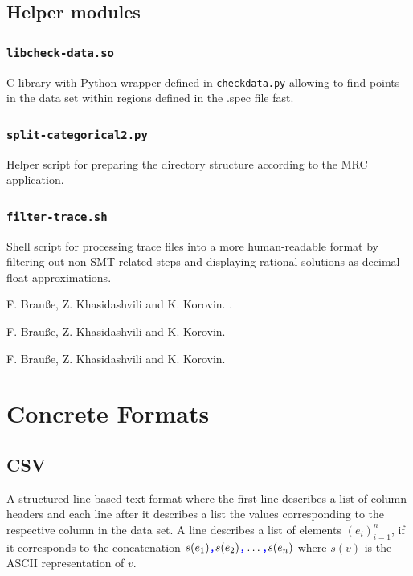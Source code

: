 \documentclass[a4paper,parskip=half]{article} %
\newcommand*\cmdstyle\texttt
\newcommand*\file\cmdstyle
\newcommand*\literalColor{blue}
\newcommand*\cmd[1]{\cmdstyle{\textcolor{red!85!black}{#1}}}
\newcommand*\literal[1]{\textcolor{\literalColor}{\cmdstyle{#1}}}
\begin{document}
\subsection{Helper modules}
\subsubsection{\file{libcheck-data.so}}
C-library with Python wrapper defined in \file{checkdata.py} allowing to find
points in the data set within regions defined in the .spec file fast.

\subsubsection{\cmd{split-categorical2.py}}
Helper script for preparing the directory structure according to the MRC
application.

\subsubsection{\cmd{filter-trace.sh}}
Shell script for processing trace files into a more human-readable format by
filtering out non-SMT-related steps and displaying rational solutions as
decimal float approximations.



\begin{thebibliography}{99}
 F. Brauße, Z. Khasidashvili and K. Korovin.
.

 F. Brauße, Z. Khasidashvili and K. Korovin.


 F. Brauße, Z. Khasidashvili and K. Korovin.
\end{thebibliography}


\appendix
\section{Concrete Formats}
\subsection{CSV}\label{sec:csv}
A structured line-based text format where the first line describes a
list of column headers and each line after it describes a list the
values corresponding to the respective column in the data set.
A line describes a list of elements $(e_i)_{i=1}^n$, if it corresponds
to the concatenation
$s(e_1)\literal,s(e_2)\literal,\ldots\literal,s(e_n)$
where $s(v)$ is the ASCII representation of $v$.
\end{document}
